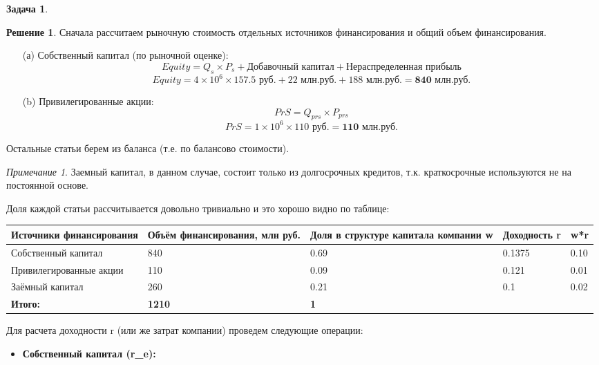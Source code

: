 \documentclass[a4paper, 14pt]{article}
\theoremstyle{plain} %
\theoremstyle{definition} %
\newtheorem*{solution}{Решение}
\newtheorem{problem}{Задача}[subsection]
\theoremstyle{remark} %
\newtheorem{nota}{Примечание}
\begin{document}
\begin{problem}
\begin{itemize}
\end{itemize}
	\begin{solution}
		Сначала рассчитаем рыночную стоимость отдельных источников финансирования и общий объем финансирования.
	\begin{itemize}
		\item[(а)] Собственный капитал (по рыночной оценке):
		\[Equity = Q_{s} \times P_{s} + \textit{Добавочный капитал} + \textit{Нераспределенная прибыль}\]
		\[Equity = 4 \times 10^{6} \times \text{157.5 руб.} +  \text{22 млн.руб.} +  \text{188 млн.руб.} = \textbf{840 млн.руб.}\]
		\item[(b)] Привилегированные акции:
		\[PrS = Q_{prs} \times P_{prs}\]
		\[PrS = 1 \times 10^{6} \times \text{110 руб.} = \textbf{110 млн.руб.}\]
	\end{itemize}
		Остальные статьи берем из баланса (т.е. по балансово	 стоимости).
		\begin{nota}
			Заемный капитал, в данном случае, состоит только из долгосрочных кредитов, т.к. краткосрочные используются не на постоянной основе.
		\end{nota}
		Доля каждой статьи рассчитывается довольно тривиально и это хорошо видно по таблице:
\begin{center}
\begin{tabular}[0.96\textwidth]{|l|p{3.2cm}|p{3.2cm}|l|l|}
\hline
Источники финансирования & Объём финансирования, млн руб. & Доля в структуре капитала компании w & Доходность r & w*r   \\
\hline
Собственный капитал      & 840                            & 0.69                                 & 0.1375       & 0.10  \\
\hline
Привилегированные акции  & 110                            & 0.09                                 & 0.121        & 0.01  \\
\hline
Заёмный капитал          & 260                            & 0.21                                 & 0.1          & 0.02  \\
\hline
\textbf{Итого:}                   & \textbf{1210}                           & \textbf{1}                                    &              &       \\
\hline
\end{tabular}
\end{center}

Для расчета доходности r (или же затрат компании) проведем следующие операции:
\begin{itemize}
	\item \textbf{Собственный капитал (r_{e}):}


\end{itemize}
\end{solution}
\end{problem}
\end{document}
